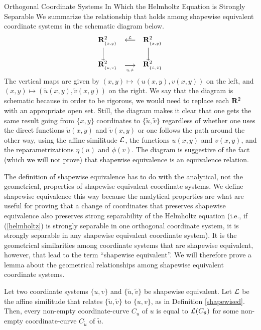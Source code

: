 \begin{section}{Orthogonal Coordinate Systems In Which the Helmholtz Equation is Strongly Separable}
We summarize the relationship that holds among shapewise equivalent coordinate systems in the schematic diagram below.
\begin{equation}
\label{diagram}
\begin{array}{ccc}
\mathbf{R}^2_{_{\{ x,y \} }} & \stackrel{_{\mathcal{L}}}{\displaystyle \longleftarrow} & \mathbf{R}^2_{_{\{ x,y \} }} \\ [2pt]
\stackrel{}{\Big\downarrow} \mbox{ } \mbox{ } \mbox{ } & & \stackrel{}{\Big\downarrow} \mbox{ } \mbox{ } \mbox{ } \\ [2pt]
\mathbf{R}^2_{_{\{ u,v \} }} & {}_{\stackrel{\displaystyle \longrightarrow}{_{\eta, \phi}}} & \mathbf{R}^2_{_{\{ \tilde{u},\tilde{v} \} }}
\end{array}
\end{equation}
The vertical maps are given by $(x,y) \mapsto (u(x,y),v(x,y))$ on the left, and $(x,y) \mapsto (\tilde{u}(x,y),\tilde{v}(x,y))$ on the right.  We say that the diagram is schematic because in order to be rigorous, we would need to replace each $\mathbf{R}^2$ with an appropriate open set.  Still, the diagram makes it clear that one gets the same result going from $\{ x,y \}$ coordinates to $\{ \tilde{u},\tilde{v} \}$ regardless of whether one uses the direct functions $\tilde{u}(x,y)$ and $\tilde{v}(x,y)$ or one follows the path around the other way, using the affine similitude $\mathcal{L}$, the functions $u(x,y)$ and $v(x,y)$, and the reparametrizations $\eta(u)$ and $\phi(v)$.  The diagram is suggestive of the fact (which we will not prove) that shapewise equivalence is an equivalence relation.

The definition of shapewise equivalence has to do with the analytical, not the geometrical, properties of shapewise equivalent coordinate systems.  We define shapewise equivalence this way because the analytical properties are what are useful for proving that a change of coordinates that preserves shapewise equivalence also preserves strong separability of the Helmholtz equation (i.e., if (\ref{helmholtz}) is strongly separable in one orthogonal coordinate system, it is strongly separable in any shapewise equivalent coordinate system).  It is the geometrical similarities among coordinate systems that are shapewise equivalent, however, that lead to the term ``shapewise equivalent''.  We will therefore prove a lemma about the geometrical relationships among shapewise equivalent coordinate systems.

\begin{lemma}
\label{geomprops}
Let two coordinate systems $\{ u,v \}$ and $\{ \tilde{u},\tilde{v} \}$ be shapewise equivalent.  Let $\mathcal{L}$ be the affine similitude that relates $\{ \tilde{u},\tilde{v} \}$ to $\{ u,v \}$, as in Definition \ref{shapewised}.  Then, every non-empty coordinate-curve $C_u$ of $u$ is equal to $\mathcal{L}(C_{\tilde{u}})$ for some non-empty coordinate-curve $C_{\tilde{u}}$ of $\tilde{u}$.
\end{lemma}


\end{section}

